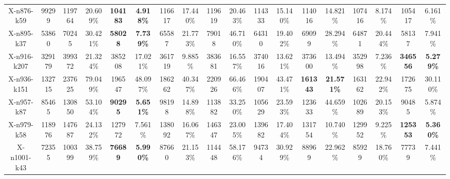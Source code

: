 \documentclass{article}
\theoremstyle{plain}
\theoremstyle{definition}
\theoremstyle{remark}
\begin{document}
\begin{table}[htbp]
\begin{center}
\begin{small}
{\begin{tabular}{cc|cccccccccccccccc}
X-n876-k59       & 99299      & 119764       & 20.609\%      & \cellcolor[HTML]{D0CECE}\textbf{104183} & \cellcolor[HTML]{D0CECE}\textbf{4.918\%} & 116617       & 17.440\%      & 119619       & 20.463\%      & 114333        & 15.140\%       & 114016          & 14.821\%          & 107416          & 8.174\%           & 105417           & 6.161\%           \\
X-n895-k37       & 53860      & 70245        & 30.421\%      & \cellcolor[HTML]{D0CECE}\textbf{58028}  & \cellcolor[HTML]{D0CECE}\textbf{7.739\%} & 65587        & 21.773\%      & 79018        & 46.710\%      & 64310         & 19.402\%       & 69099           & 28.294\%          & 64871           & 20.444\%          & 58137            & 7.941\%           \\
X-n916-k207      & 329179     & 399372       & 21.324\%      & 385208          & 17.021\%         & 361719       & 9.885\%       & 383681       & 16.557\%      & 374016        & 13.621\%       & 373600          & 13.494\%          & 352998          & 7.236\%           & \cellcolor[HTML]{D0CECE}\textbf{346556}  & \cellcolor[HTML]{D0CECE}\textbf{5.279\%}  \\
X-n936-k151      & 132715     & 237625       & 79.049\%      & 196547          & 48.097\%         & 186262       & 40.347\%      & 220926       & 66.466\%      & 190407        & 43.471\%       & \cellcolor[HTML]{D0CECE}\textbf{161343} & \cellcolor[HTML]{D0CECE}\textbf{21.571\%} & 163162          & 22.942\%          & 172675           & 30.110\%          \\
X-n957-k87       & 85465      & 130850       & 53.104\%      & \cellcolor[HTML]{D0CECE}\textbf{90295}  & \cellcolor[HTML]{D0CECE}\textbf{5.651\%} & 98198        & 14.898\%      & 113882       & 33.250\%      & 105629        & 23.593\%       & 123633          & 44.659\%          & 102689          & 20.153\%          & 90485            & 5.874\%           \\
X-n979-k58       & 118976     & 147687       & 24.132\%      & 127972          & 7.561\%          & 138092       & 16.067\%      & 146347       & 23.005\%      & 139682        & 17.404\%       & 131754          & 10.740\%          & 129952          & 9.225\%           & \cellcolor[HTML]{D0CECE}\textbf{125353}  & \cellcolor[HTML]{D0CECE}\textbf{5.360\%}  \\
X-n1001-k43      & 72355      & 100399       & 38.759\%      & \cellcolor[HTML]{D0CECE}\textbf{76689}  & \cellcolor[HTML]{D0CECE}\textbf{5.990\%} & 87660        & 21.153\%      & 114448       & 58.176\%      & 94734         & 30.929\%       & 88969           & 22.962\%          & 85929           & 18.760\%          & 77739            & 7.441\%           \\ \hline

\end{tabular}}
\end{small}
\end{center}
\end{table}
\end{document}
